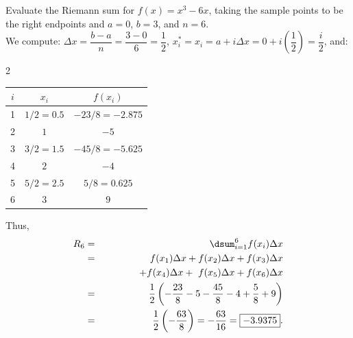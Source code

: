 \documentclass{book}
\begin{document}
\begin{Exam} Evaluate the Riemann sum for $f(x) = x^3-6x$, taking the sample points to be the right endpoints and $a=0$, $b=3$, and $n=6$.\\

We compute: $\Delta x = \dfrac{b-a}{n} = \dfrac{3-0}{6} = \dfrac{1}{2}$, $x_i^* = x_i = a+i\Delta x = 0+i\left(\dfrac{1}{2}\right) = \dfrac{i}{2}$, and:
\begin{multicols}{2}
\begin{center}
\begin{tabular}{c|c|c}
$i$ & $x_i$ & $f(x_i)$ \\ \hline\hline
1 & $1/2 = 0.5$ & $-23/8 = -2.875$ \\ \hline 
2 & $1$ & $-5$ \\ \hline
3 & $3/2 = 1.5$ & $-45/8=-5.625$ \\ \hline
4 & $2$ & $-4$ \\ \hline
5 & $5/2 = 2.5$ & $5/8= 0.625$ \\ \hline
6 & $3$ & $9$ \\ 
\end{tabular}
\end{center}
Thus, \begin{eqnarray*}
R_6 &=& \dsum_{i=1}^6 f(x_i)\Delta x\\
 &=& f(x_1)\Delta x + f(x_2)\Delta x + f(x_3)\Delta x \\
 &&\hspace{0.5 in} + f(x_4)\Delta x+\ f(x_5)\Delta x + f(x_6)\Delta x\\
&=& \dfrac{1}{2}\left(-\dfrac{23}{8} - 5 - \dfrac{45}{8} - 4 + \dfrac{5}{8} + 9\right)\\
 &=& \dfrac{1}{2}\left(-\dfrac{63}{8}\right) = -\dfrac{63}{16} = \fbox{$-3.9375$}.
\end{eqnarray*}
\end{multicols}
\end{Exam}\vs
\end{document}
